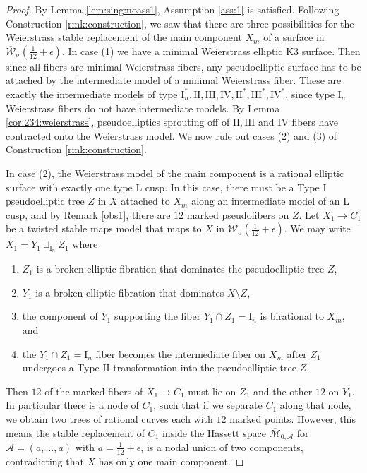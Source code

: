 \documentclass[11pt]{amsart}
\theoremstyle{definition}
\theoremstyle{remark}
\newcommand{\calM}{\mathcal M}
\newcommand{\calA}{\mathcal A}
\newcommand{\calW}{\mathcal W}
\newcommand{\ktwelve}{\overline{\calW}_\sigma({\frac{1}{12}+\epsilon})}
\begin{document}
	\begin{proof} By Lemma \ref{lem:sing:noass1}, Assumption \ref{ass:1} is satisfied. Following Construction \ref{rmk:construction}, we saw that there are three possibilities for the Weierstrass stable replacement of the main component $X_m$ of a surface in $\ktwelve$. In case (1) we have a minimal Weierstrass elliptic K3 surface. Then since all fibers are minimal Weierstrass fibers, any pseudoelliptic surface has to be attached by the intermediate model of a minimal Weierstrass fiber. These are exactly the intermediate models of type $\mathrm{I}_n^*, \mathrm{II}, \mathrm{III}, \mathrm{IV}, \mathrm{II}^*, \mathrm{III}^*, \mathrm{IV}^*$, since type $\mathrm{I}_n$ Weierstrass fibers do not have intermediate models. By Lemma \ref{cor:234:weierstrass}, pseudoelliptics sprouting off of $\mathrm{II}, \mathrm{III}$ and $\mathrm{IV}$ fibers have contracted onto the Weierstrass model. We now rule out cases (2) and (3) of Construction \ref{rmk:construction}. 
		
		In case (2), the Weierstrass model of the main component is a rational elliptic surface with exactly one type L cusp. In this case, there must be a Type $\mathrm{I}$ pseudoelliptic tree $Z$ in $X$  attached to $X_m$ along an intermediate model of an L cusp, and by Remark \ref{obs1}, there are $12$ marked pseudofibers on $Z$. Let $X_1 \to C_1$ be a twisted stable maps model that maps to $X$ in $\ktwelve$. We may write $X_1 = Y_1 \sqcup_{\mathrm{I}_n} Z_1$ where
		\begin{enumerate}
			\item $Z_1$ is a broken elliptic fibration that dominates the pseudoelliptic tree $Z$,
			\item $Y_1$ is a broken elliptic fibration that dominates $X \setminus Z$, 
			\item  the component of $Y_1$ supporting the fiber $Y_1 \cap Z_1 = \mathrm{I}_n$ is birational to $X_m$, and
			\item the $Y_1 \cap Z_1 = \mathrm{I}_n$ fiber becomes the intermediate fiber on $X_m$ after $Z_1$ undergoes a Type $\mathrm{II}$ transformation into the pseudoelliptic tree $Z$. 
		\end{enumerate}
		Then $12$ of the marked fibers of $X_1 \to C_1$ must lie on $Z_1$ and the other $12$ on $Y_1$. In particular there is a node of $C_1$, such that if we separate $C_1$ along that node, we obtain two trees of rational curves each with $12$ marked points. However, this means the stable replacement of $C_1$ inside the Hassett space $\overline{\calM}_{0, \calA}$ for $\calA = (a, \ldots, a)$ with $a = \frac{1}{12} + \epsilon$, is a nodal union of two components, contradicting that $X$ has only one main component. 
		

\end{proof}
\end{document}
